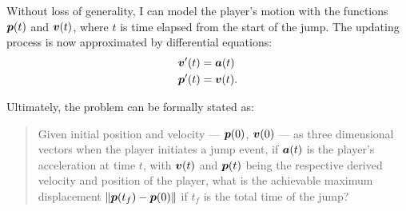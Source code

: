 Without loss of generality, I can model the player's motion with the functions $\boldsymbol{p}(t)$ and $\boldsymbol{v}(t)$, where $t$ is time elapsed from the start of the jump. The updating process is now approximated by differential equations:
\begin{align}
    \boldsymbol{v}'(t) &= \boldsymbol{a}(t) \label{eq:1de1}\\
    \boldsymbol{p}'(t) &= \boldsymbol{v}(t) \label{eq:1de2}.
\end{align}

Ultimately, the problem can be formally stated as:
\begin{quote}
    Given initial position and velocity --- $\boldsymbol{p}(0)$, $\boldsymbol{v}(0)$ --- as three dimensional vectors when the player initiates a jump event, if $\boldsymbol{a}(t)$ is the player's acceleration at time $t$, with $\boldsymbol{v}(t)$ and $\boldsymbol{p}(t)$ being the respective derived velocity and position of the player, what is the achievable maximum displacement $\|\boldsymbol{p}(t_f) - \boldsymbol{p}(0)\|$ if $t_f$ is the total time of the jump?
\end{quote}


